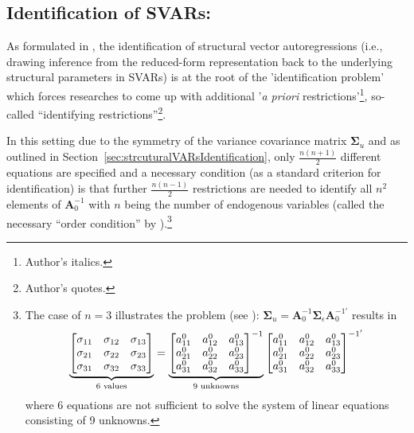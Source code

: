 \documentclass[a4paper,11pt,listof=nochaptergap,oneside,pointednumbers,bibtotoc,bigheadings,liststotoc,hidelinks]{scrbook}
\theoremstyle{mysatz}
\theoremstyle{mydefinition}
\theoremstyle{mytheorem}
\theoremstyle{mybemerkung}
\newcommand{\vect}[1]{\boldsymbol{\mathbf{#1}}}
\begin{document}
	
\subsection{Identification of SVARs: \citet{rubioetal:10}}
\label{sec:observationalEquivalence}
As formulated in \citet{rubioetal:10}, the identification of structural vector autoregressions (i.e., drawing inference from the reduced-form representation back to the underlying structural parameters in SVARs) is at the root of the 'identification problem' which forces researches to come up with additional '\textit{a priori} restrictions'\footnote{Author's italics.}, so-called ``identifying restrictions''\footnote{Author's quotes.}.

In this setting due to the symmetry of the variance covariance matrix $\vect{\Sigma}_u$ and as outlined in Section~\ref{sec:strcuturalVARsIdentification}, only $\frac{n(n+1)}{2}$ different equations are specified and a necessary condition (as a standard criterion for identification) is that further $\frac{n(n-1)}{2}$ restrictions are needed to identify all $n^2$ elements of $\vect{A}_0^{-1}$ with $n$ being the number of endogenous variables (called the necessary ``order condition'' by \citealp{rothenberg:71}).\footnote{The case of $n=3$ illustrates the problem (see \citealp{foroni:14}): $\vect{\Sigma}_u = \vect{A}_{0}^{-1}\vect{\Sigma}_\epsilon\vect{A}_{0}^{-1'}$ results in $$		
		\underbrace{%
		\begin{bmatrix}
    		\sigma_{11} & \sigma_{12} & \sigma_{13} \\
		\sigma_{21} & \sigma_{22} & \sigma_{23} \\
		\sigma_{31} & \sigma_{32} & \sigma_{33}
 		\end{bmatrix}
}_{\text{6 values}} = \underbrace{%
		\begin{bmatrix}
    		a_{11}^0 & a_{12}^0 & a_{13}^0 \\
		a_{21}^0 & a_{22}^0 & a_{23}^0 \\
		a_{31}^0 & a_{32}^0 & a_{33}^0
 		\end{bmatrix}^{-1}
}_{\text{9 unknowns}}
\begin{bmatrix}
    		a_{11}^0 & a_{12}^0 & a_{13}^0 \\
		a_{21}^0 & a_{22}^0 & a_{23}^0 \\
		a_{31}^0 & a_{32}^0 & a_{33}^0
 		\end{bmatrix}^{{-1}'}$$ 
		where 6 equations are not sufficient to solve the system of linear equations consisting of 9 unknowns.}
		
\end{document}
